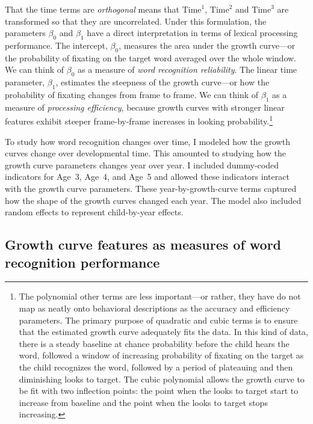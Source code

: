 \documentclass [11pt, proquest] {uwthesis}[2015/03/03]
\begin{document}
That the time terms are \emph{orthogonal} means that \(\text{Time}^1\),
\(\text{Time}^2\) and \(\text{Time}^3\) are transformed so that they are
uncorrelated. Under this formulation, the parameters \(\beta_0\) and
\(\beta_1\) have a direct interpretation in terms of lexical processing
performance. The intercept, \(\beta_0\), measures the area under the
growth curve---or the probability of fixating on the target word
averaged over the whole window. We can think of \(\beta_0\) as a measure
of \emph{word recognition reliability}. The linear time parameter,
\(\beta_1\), estimates the steepness of the growth curve---or how the
probability of fixating changes from frame to frame. We can think of
\(\beta_1\) as a measure of \emph{processing efficiency}, because growth
curves with stronger linear features exhibit steeper frame-by-frame
increases in looking probability.\footnote{The polynomial other terms
  are less important---or rather, they have do not map as neatly onto
  behavioral descriptions as the accuracy and efficiency parameters. The
  primary purpose of quadratic and cubic terms is to ensure that the
  estimated growth curve adequately fits the data. In this kind of data,
  there is a steady baseline at chance probability before the child
  hears the word, followed a window of increasing probability of
  fixating on the target as the child recognizes the word, followed by a
  period of plateauing and then diminishing looks to target. The cubic
  polynomial allows the growth curve to be fit with two inflection
  points: the point when the looks to target start to increase from
  baseline and the point when the looks to target stops increasing.}

To study how word recognition changes over time, I modeled how the
growth curves change over developmental time. This amounted to studying
how the growth curve parameters changes year over year. I included
dummy-coded indicators for Age~3, Age~4, and Age~5 and allowed these
indicators interact with the growth curve parameters. These
year-by-growth-curve terms captured how the shape of the growth curves
changed each year. The model also included random effects to represent
child-by-year effects.

\subsection{Growth curve features as measures of word recognition
performance}\label{growth-curve-features-as-measures-of-word-recognition-performance}
\end{document}
